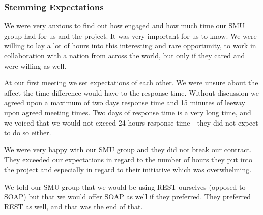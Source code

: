 \subsubsection{Stemming Expectations}
We were very anxious to find out how engaged and how much time our SMU group had for us and the project. It was very important for us to know. We were willing to lay a lot of hours into this interesting and rare opportunity, to work in collaboration with a nation from across the world, but only if they cared and were willing as well.

At our first meeting we set expectations of each other. We were unsure about the affect the time difference would have to the response time. Without discussion we agreed upon a maximum of two days response time and 15 minutes of leeway upon agreed meeting times. Two days of response time is a very long time, and we voiced that we would not exceed 24 hours response time - they did not expect to do so either.

We were very happy with our SMU group and they did not break our contract. They exceeded our expectations in regard to the number of hours they put into the project and especially in regard to their initiative which was overwhelming.

We told our SMU group that we would be using REST ourselves (opposed to SOAP) but that we would offer SOAP as well if they preferred. They preferred REST as well, and that was the end of that.
